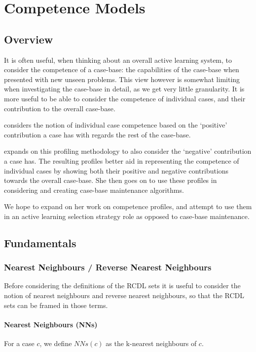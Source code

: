 \documentclass[a4paper,11pt]{report}
\begin{document}
\chapter{Competence Models\label{cha:CompetenceModels}}
\section{Overview}
It is often useful, when thinking about an overall active learning system, to consider the competence of a case-base: the capabilities of the case-base when presented with new unseen problems. This view however is somewhat limiting when investigating the case-base in detail, as we get very little granularity. It is more useful to be able to consider the competence of individual cases, and their contribution to the overall case-base.

\citet{Smyth1995} considers the notion of individual case competence based on the `positive' contribution a case has with regards the rest of the case-base.

\citet{Delany2009} expands on this profiling methodology to also consider the `negative' contribution a case has. The resulting profiles better aid in representing the competence of individual cases by showing both their positive and negative contributions towards the overall case-base. She then goes on to use these profiles in considering and creating case-base maintenance algorithms. 

We hope to expand on her work on competence profiles, and attempt to use them in an active learning selection strategy role as opposed to case-base maintenance.

\section{Fundamentals}
\subsection{Nearest Neighbours / Reverse Nearest Neighbours}
Before considering the definitions of the RCDL sets it is useful to consider the notion of nearest neighbours and reverse nearest neighbours, so that the RCDL sets can be framed in those terms.

\subsubsection{Nearest Neighbours (NNs)}
For a case $c$, we define $NNs(c)$ as the k-nearest neighbours of $c$.
\end{document}
